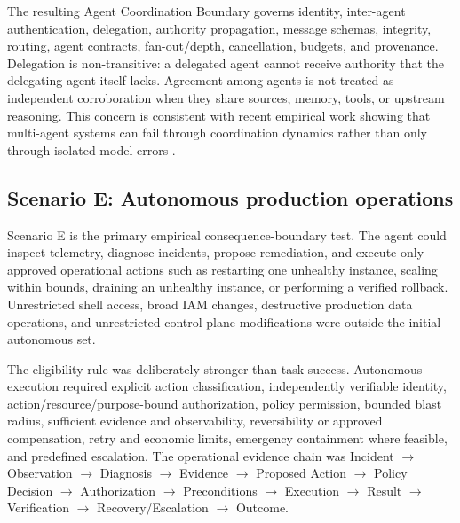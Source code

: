 \documentclass[conference]{IEEEtran}
\begin{document}
The resulting Agent Coordination Boundary governs identity, inter-agent authentication, delegation, authority propagation, message schemas, integrity, routing, agent contracts, fan-out/depth, cancellation, budgets, and provenance. Delegation is non-transitive: a delegated agent cannot receive authority that the delegating agent itself lacks. Agreement among agents is not treated as independent corroboration when they share sources, memory, tools, or upstream reasoning. This concern is consistent with recent empirical work showing that multi-agent systems can fail through coordination dynamics rather than only through isolated model errors \cite{r13,r14}.

\subsection{Scenario E: Autonomous production operations}
Scenario E is the primary empirical consequence-boundary test. The agent could inspect telemetry, diagnose incidents, propose remediation, and execute only approved operational actions such as restarting one unhealthy instance, scaling within bounds, draining an unhealthy instance, or performing a verified rollback. Unrestricted shell access, broad IAM changes, destructive production data operations, and unrestricted control-plane modifications were outside the initial autonomous set.

The eligibility rule was deliberately stronger than task success. Autonomous execution required explicit action classification, independently verifiable identity, action/resource/purpose-bound authorization, policy permission, bounded blast radius, sufficient evidence and observability, reversibility or approved compensation, retry and economic limits, emergency containment where feasible, and predefined escalation. The operational evidence chain was Incident $\rightarrow$ Observation $\rightarrow$ Diagnosis $\rightarrow$ Evidence $\rightarrow$ Proposed Action $\rightarrow$ Policy Decision $\rightarrow$ Authorization $\rightarrow$ Preconditions $\rightarrow$ Execution $\rightarrow$ Result $\rightarrow$ Verification $\rightarrow$ Recovery/Escalation $\rightarrow$ Outcome.
\end{document}
